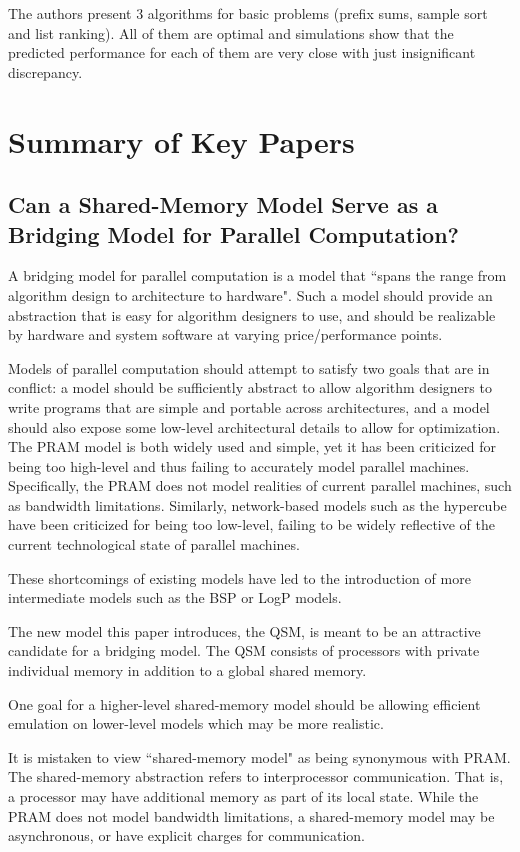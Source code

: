 \documentclass[12pt,a4paper]{article}
\begin{document}
The authors present 3 algorithms for basic problems (prefix sums, sample sort and list ranking). All of them are optimal and simulations show that the 
predicted performance for each of them are very close with just insignificant discrepancy.

\section{Summary of Key Papers}
\subsection{Can a Shared-Memory Model Serve as a Bridging Model for Parallel Computation?}
A bridging model for parallel computation is a model that ``spans the range from algorithm design to architecture to hardware". \cite{Gib99}
Such a model should provide an abstraction that is easy for algorithm designers to use, and should be realizable by hardware and system software at varying
price/performance points.

Models of parallel computation should attempt to satisfy two goals that are in conflict: a model should be sufficiently abstract to allow algorithm designers to
write programs that are simple and portable across architectures, and a model should also expose some low-level architectural details to allow for optimization. 
The PRAM model is both widely used and simple, yet it has been criticized for being too high-level and thus failing to accurately model parallel machines.
Specifically, the PRAM does not model realities of current parallel machines, such as bandwidth limitations. Similarly, network-based models such as the
hypercube have been criticized for being too low-level, failing to be widely reflective of the current technological state of parallel machines. 

These shortcomings of existing models have led to the introduction of more intermediate models such as the BSP or LogP models.

The new model this paper introduces, the QSM, is meant to be an attractive candidate for a bridging model. The QSM consists of processors with private
individual memory in addition to a global shared memory.

One goal for a 
higher-level shared-memory model should be allowing efficient emulation on lower-level models which may be more realistic. 

It is mistaken to view ``shared-memory model" as being synonymous with PRAM. The shared-memory abstraction refers to interprocessor communication. That is, a
processor may have additional memory as part of its local state. While the PRAM does not model bandwidth limitations, a shared-memory model may be
asynchronous, or have explicit charges for communication. 
\end{document}
